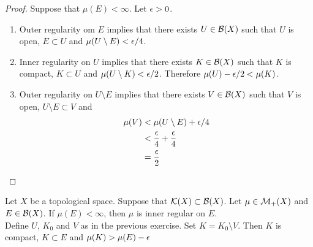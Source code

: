 \documentclass{book}
\begin{document}
	\begin{proof}
		Suppose that $\mu(E) < \infty$. Let $\epsilon >0$. 
		\begin{enumerate}
			\item Outer regularity om $E$ implies that there exists $U \in \mathcal{B}(X)$ such that $U$ is open, $E \subset U$ and $\mu(U \setminus E) < \epsilon/4$. 
			\item Inner regularity on $U$ implies that there exists $K \in \mathcal{B}(X)$ such that $K$ is compact, $K \subset U$ and $\mu(U \setminus K) < \epsilon/2$. Therefore $\mu(U) - \epsilon/2 < \mu(K) $.
			\item Outer regularity on $U \setminus E$ implies that there exists $V \in \mathcal{B}(X)$ such that $V$ is open, $U \setminus E \subset V$ and 
			\begin{align*}
				\mu(V) 
				& < \mu(U \setminus E) + \epsilon/4 \\
				& < \frac{\epsilon}{4} + \frac{\epsilon}{4} \\
				& = \frac{\epsilon}{2}
			\end{align*}
		\end{enumerate}
	\end{proof}
	
	\begin{ex}  
		Let $X$ be a topological space. Suppose that $\mathcal{K}(X) \subset \mathcal{B}(X)$. Let $\mu \in \mathcal{M}_+(X)$ and $E \in \mathcal{B}(X)$. If $\mu(E) < \infty$, then $\mu$ is inner regular on $E$. \\
		 Define $U$, $K_0$ and $V$ as in the previous exercise. Set $K = K_0 \setminus V$. Then $K$ is compact, $K \subset E$ and $\mu(K) > \mu(E) - \epsilon$ 
	\end{ex}
	
\end{document}
